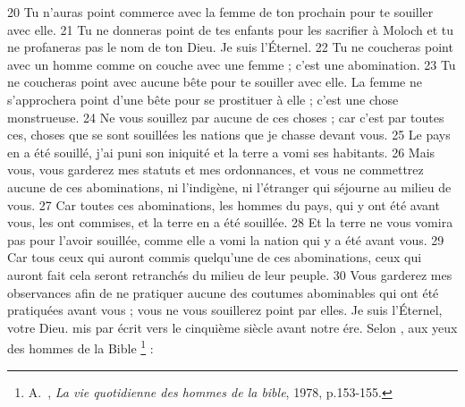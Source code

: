 {{20 Tu n'auras point commerce avec la femme de ton prochain pour te souiller avec elle.
21 Tu ne donneras point de tes enfants pour les sacrifier à Moloch et tu ne profaneras pas le nom de ton Dieu. Je suis l'Éternel.
22 Tu ne coucheras point avec un homme comme on couche avec une femme ; c'est une abomination.
23 Tu ne coucheras point avec aucune bête pour te souiller avec elle. La femme ne s'approchera point d'une bête pour se prostituer à elle ; c'est une chose monstrueuse.
24 Ne vous souillez par aucune de ces choses ; car c'est par toutes ces, choses que se sont souillées les nations que je chasse devant vous.
25 Le pays en a été souillé, j'ai puni son iniquité et la terre a vomi ses habitants.
26 Mais vous, vous garderez mes statuts et mes ordonnances, et vous ne commettrez aucune de ces abominations, ni l'indigène, ni l'étranger qui séjourne au milieu de vous.
27 Car toutes ces abominations, les hommes du pays, qui y ont été avant vous, les ont commises, et la terre en a été souillée.
28 Et la terre ne vous vomira pas pour l'avoir souillée, comme elle a vomi la nation qui y a été avant vous.
29 Car tous ceux qui auront commis quelqu'une de ces abominations, ceux qui auront fait cela seront retranchés du milieu de leur peuple.
30 Vous garderez mes observances afin de ne pratiquer aucune des coutumes abominables qui ont été pratiquées avant vous ; vous ne vous souillerez point par elles. Je suis l'Éternel, votre Dieu. }} mis par écrit vers le cinquième siècle avant notre ére. Selon , aux yeux des hommes
 de la Bible%
\footnote{A.~, \emph{La vie quotidienne des hommes de la bible}, 1978, p.153-155.}%
 :

